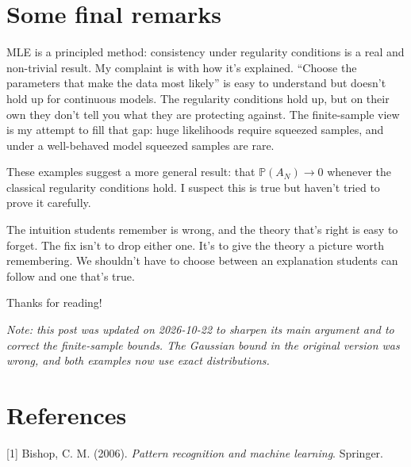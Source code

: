\documentclass{article}
\begin{document}
\section{Some final remarks}

MLE is a principled method: consistency under regularity conditions is a real and non-trivial result. My complaint is with how it's explained. ``Choose the parameters that make the data most likely'' is easy to understand but doesn't hold up for continuous models. The regularity conditions hold up, but on their own they don't tell you what they are protecting against. The finite-sample view is my attempt to fill that gap: huge likelihoods require squeezed samples, and under a well-behaved model squeezed samples are rare.

These examples suggest a more general result: that $\mathbb{P}(A_N) \to 0$ whenever the classical regularity conditions hold. I suspect this is true but haven't tried to prove it carefully.

The intuition students remember is wrong, and the theory that's right is easy to forget. The fix isn't to drop either one. It's to give the theory a picture worth remembering. We shouldn't have to choose between an explanation students can follow and one that's true.

Thanks for reading!

\emph{Note: this post was updated on 2026-10-22 to sharpen its main argument and to correct the finite-sample bounds. The Gaussian bound in the original version was wrong, and both examples now use exact distributions.}

\section{References}

[1] Bishop, C. M. (2006). \emph{Pattern recognition and machine learning}. Springer.
\end{document}
